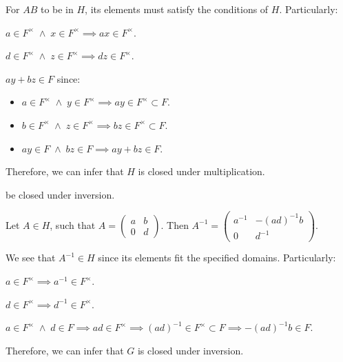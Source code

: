 \begin{problem}
\begin{enumalph}
\begin{Answer}
\begin{enumalph}
          For $AB$ to be in $H$, its elements must satisfy the conditions of $H$.
          Particularly:
          \begin{enumroman}
            \item $a \in F^\times \; \land \; x \in F^\times \implies ax \in F^\times$.
            \item $d \in F^\times \; \land \; z \in F^\times \implies dz \in F^\times$.
            \item $ay + bz \in F$ since:
              \begin{itemize}
                \item $ a \in F^\times \; \land \; y \in F^\times \implies ay \in F^\times \subset F$.
                \item $ b \in F^\times \; \land \; z \in F^\times \implies bz \in F^\times \subset F$.
                \item $ay \in F \; \land \; bz \in F \implies ay + bz \in F$.
              \end{itemize}          
          \end{enumroman}
          Therefore, we can infer that $H$ is closed under multiplication.
        \item be closed under inversion.

          Let $A \in H$, such that 
          $A = \left(
            \begin{smallmatrix}
              a & b \\
              0 & d
            \end{smallmatrix}
          \right)$.
          Then $A^{-1} = \left(
            \begin{smallmatrix}
              a^{-1} & -{(ad)}^{-1}b \\
              0 & d^{-1}
            \end{smallmatrix}
          \right)$.

          We see that $A^{-1} \in H$ since its elements fit the specified domains.
          Particularly:
          \begin{enumroman}
            \item $a \in F^\times \implies a^{-1} \in F^\times$.
            \item $d \in F^\times \implies d^{-1} \in F^\times$.
            \item $a \in F^\times \; \land \; d \in F \implies ad \in F^\times
            \implies {(ad)}^{-1} \in F^\times \subset F \implies -{(ad)}^{-1}b \in F$.
          \end{enumroman}
          Therefore, we can infer that $G$ is closed under inversion.
      \end{enumalph}
    \end{Answer}


\end{enumalph}
\end{problem}
